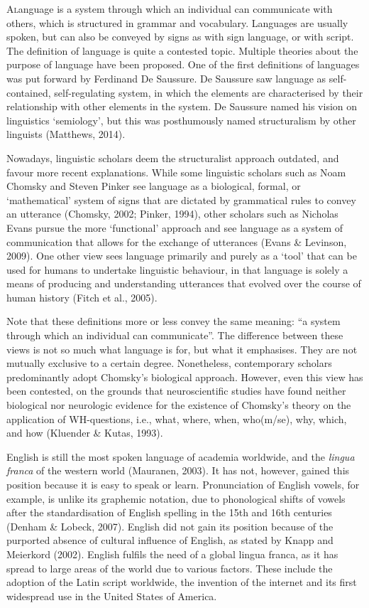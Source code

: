 

\lettrine{A} language is a system through which an individual can communicate with others, which is structured in grammar and vocabulary. Languages are usually spoken, but can also be conveyed by signs as with sign language, or with script. The definition of language is quite a contested topic. Multiple theories about the purpose of language have been proposed. One of the first definitions of languages was put forward by Ferdinand De Saussure. De Saussure saw language as self-contained, self-regulating system, in which the elements are characterised by their relationship with other elements in the system. De Saussure named his vision on linguistics ‘semiology’, but this was posthumously named structuralism by other linguists (Matthews, 2014). 

Nowadays, linguistic scholars deem the structuralist approach outdated, and favour more recent explanations. While some linguistic scholars such as Noam Chomsky and Steven Pinker see language as a biological, formal, or ‘mathematical’ system of signs that are dictated by grammatical rules to convey an utterance (Chomsky, 2002; Pinker, 1994), other scholars such as Nicholas Evans pursue the more ‘functional’ approach and see language as a system of communication that allows for the exchange of utterances (Evans \& Levinson, 2009). One other view sees language primarily and purely as a ‘tool’ that can be used for humans to undertake linguistic behaviour, in that language is solely a means of producing and understanding utterances that evolved over the course of human history (Fitch et al., 2005). 

Note that these definitions more or less convey the same meaning: “a system through which an individual can communicate”. The difference between these views is not so much what language is for, but what it emphasises. They are not mutually exclusive to a certain degree. Nonetheless, contemporary scholars predominantly adopt Chomsky's biological approach. However, even this view has been contested, on the grounds that neuroscientific studies have found neither biological nor neurologic evidence for the existence of Chomsky’s theory on the application of WH-questions, i.e., what, where, when, who(m/se), why, which, and how (Kluender \& Kutas, 1993). 

English is still the most spoken language of academia worldwide, and the \textit{lingua franca} of the western world (Mauranen, 2003). It has not, however, gained this position because it is easy to speak or learn. Pronunciation of English vowels, for example, is unlike its graphemic notation, due to phonological shifts of vowels after the standardisation of English spelling in the 15th and 16th centuries (Denham \& Lobeck, 2007). English did not gain its position because of the purported absence of cultural influence of English, as stated by Knapp and Meierkord (2002). English fulfils the need of a global lingua franca, as it has spread to large areas of the world due to various factors. These include the adoption of the Latin script worldwide, the invention of the internet and its first widespread use in the United States of America. 

